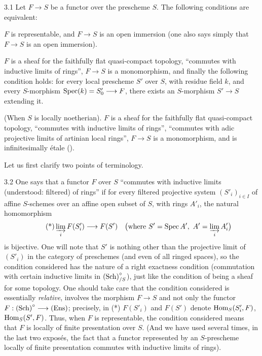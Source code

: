 \begin{proposition}{3.1}\label{XI.3.1}
Let $F\to S$ be a functor over the prescheme $S$. The following conditions are equivalent:
\begin{enumeratei}
\item $F$ is representable, and $F\to S$ is an open immersion (one also says simply that $F\to S$ is an open immersion).
\item $F$ is a sheaf for the faithfully flat quasi-compact topology, ``commutes with inductive limits of rings'', $F\to S$ is a monomorphism, and finally the following condition holds: for every local prescheme $S'$ over $S$, with residue field $k$, and every $S$-morphism $\operatorname{Spec}(k)=S'_0\longrightarrow F$, there exists an $S$-morphism $S'\to S$ extending it.
\item (When $S$ is locally noetherian). $F$ is a sheaf for the faithfully flat quasi-compact topology, ``commutes with inductive limits of rings'', ``commutes with adic projective limits of artinian local rings'', $F\to S$ is a monomorphism, and is infinitesimally étale ().
\end{enumeratei}
\end{proposition}
Let us first clarify two points of terminology.
\begin{remark}{3.2}\label{XI.3.2}
One says that a functor $F$ over $S$ ``commutes with inductive limits (understood: filtered) of rings'' if for every filtered projective system $(S'_i)_{i\in I}$ of affine $S$-schemes over an affine open subset of $S$, with rings $A'_i$, the natural homomorphism
\begin{equation}\tag{*}
\varinjlim_i F(S'_i)\longrightarrow F(S')\quad
\bigl(\text{where }S'=\operatorname{Spec} A',\ A'=\varinjlim_i A'_i\bigr)
\end{equation}
is bijective. One will note that $S'$ is nothing other than the projective limit of $(S'_i)$ in the category of preschemes (and even of all ringed spaces), so the condition considered has the nature of a right exactness condition (commutation with certain inductive limits in $\textup{(Sch)}^\circ_{/S}$), just like the condition of being a sheaf for some topology. One should take care that the condition considered is essentially \emph{relative}, \ie involves the morphism $F\to S$ and not only the functor $F:\textup{(Sch)}^\circ\longrightarrow\textup{(Ens)}$; precisely, in (*) $F(S'_i)$ and $F(S')$ denote $\operatorname{Hom}_S(S'_i,F)$, $\operatorname{Hom}_S(S',F)$. Thus, when $F$ is representable, the condition considered means that $F$ is locally of finite presentation over $S$. (And we have used several times, in the last two exposés, the fact that a functor represented by an $S$-prescheme locally of finite presentation commutes with inductive limits of rings).
\end{remark}
